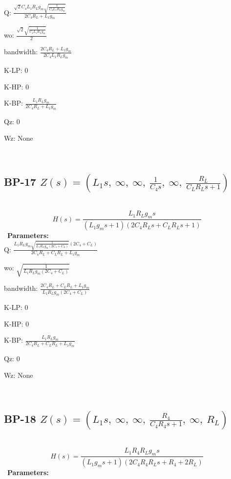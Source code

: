 \documentclass{article}
\begin{document}
Q: $\frac{\sqrt{2} C_{4} L_{1} R_{L} g_{m} \sqrt{\frac{1}{C_{4} L_{1} R_{L} g_{m}}}}{2 C_{4} R_{L} + L_{1} g_{m}}$\ 

wo: $\frac{\sqrt{2} \sqrt{\frac{1}{C_{4} L_{1} R_{L} g_{m}}}}{2}$\ 

bandwidth: $\frac{2 C_{4} R_{L} + L_{1} g_{m}}{2 C_{4} L_{1} R_{L} g_{m}}$\ 

K-LP: $0$\ 

K-HP: $0$\ 

K-BP: $\frac{L_{1} R_{L} g_{m}}{2 C_{4} R_{L} + L_{1} g_{m}}$\ 

Qz: $0$\ 

Wz: $\text{None}$\ 

\ 

\subsection{BP-17 $Z(s) = \left( L_{1} s, \  \infty, \  \infty, \  \frac{1}{C_{4} s}, \  \infty, \  \frac{R_{L}}{C_{L} R_{L} s + 1}\right)$ } \ 
\textbf{\[H(s) = \frac{L_{1} R_{L} g_{m} s}{\left(L_{1} g_{m} s + 1\right) \left(2 C_{4} R_{L} s + C_{L} R_{L} s + 1\right)}\] } \ 
\textbf{Parameters:}\\ 

Q: $\frac{L_{1} R_{L} g_{m} \sqrt{\frac{1}{L_{1} R_{L} g_{m} \left(2 C_{4} + C_{L}\right)}} \left(2 C_{4} + C_{L}\right)}{2 C_{4} R_{L} + C_{L} R_{L} + L_{1} g_{m}}$\ 

wo: $\sqrt{\frac{1}{L_{1} R_{L} g_{m} \left(2 C_{4} + C_{L}\right)}}$\ 

bandwidth: $\frac{2 C_{4} R_{L} + C_{L} R_{L} + L_{1} g_{m}}{L_{1} R_{L} g_{m} \left(2 C_{4} + C_{L}\right)}$\ 

K-LP: $0$\ 

K-HP: $0$\ 

K-BP: $\frac{L_{1} R_{L} g_{m}}{2 C_{4} R_{L} + C_{L} R_{L} + L_{1} g_{m}}$\ 

Qz: $0$\ 

Wz: $\text{None}$\ 

\ 

\subsection{BP-18 $Z(s) = \left( L_{1} s, \  \infty, \  \infty, \  \frac{R_{4}}{C_{4} R_{4} s + 1}, \  \infty, \  R_{L}\right)$ } \ 
\textbf{\[H(s) = \frac{L_{1} R_{4} R_{L} g_{m} s}{\left(L_{1} g_{m} s + 1\right) \left(2 C_{4} R_{4} R_{L} s + R_{4} + 2 R_{L}\right)}\] } \ 
\textbf{Parameters:}\\ 
\end{document}
